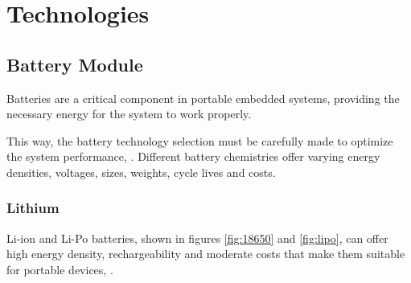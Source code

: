 \chapter{Technologies}
\label{chap:Chapter3}

\section{Battery Module}

Batteries are a critical component in portable embedded systems, providing the necessary energy for the system to work properly.

This way, the battery technology selection must be carefully made to optimize the system performance, \cite{BATT3}.
Different battery chemistries offer varying energy densities, voltages, sizes, weights, cycle lives and costs.

\subsection{Lithium}
\gls{Li-ion} and \gls{Li-Po} batteries, shown in figures \ref{fig:18650} and \ref{fig:lipo}, can offer high energy density, rechargeability and moderate costs that make them suitable for portable devices, \cite{BATT7}.

